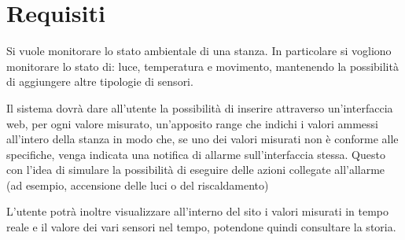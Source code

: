 \section{Requisiti}

Si vuole monitorare lo stato ambientale di una stanza. In particolare si vogliono monitorare lo stato di: luce, temperatura e movimento, mantenendo la possibilità di aggiungere altre tipologie di sensori.

Il sistema dovrà dare all'utente la possibilità di inserire attraverso un'interfaccia web, per ogni valore misurato, un'apposito range che indichi i valori ammessi all'intero della stanza in modo che, se uno dei valori misurati non è conforme alle specifiche, venga indicata una notifica di allarme sull'interfaccia stessa. Questo con l'idea di simulare la possibilità di eseguire delle azioni collegate all'allarme (ad esempio, accensione delle luci o del riscaldamento)

L'utente potrà inoltre visualizzare all'interno del sito i valori misurati in tempo reale e il valore dei vari sensori nel tempo, potendone quindi consultare la storia.
